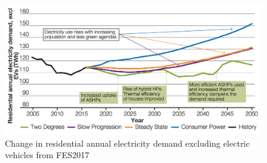 \begin{figure}\centering
	\includegraphics{_introduction/fig/electricity-demand-residential}
	\caption{Change in residential annual electricity demand excluding electric vehicles from FES2017 \cite{FES2017}}
	\label{ch-introduction:fig:electricity-demand-residential}
\end{figure}